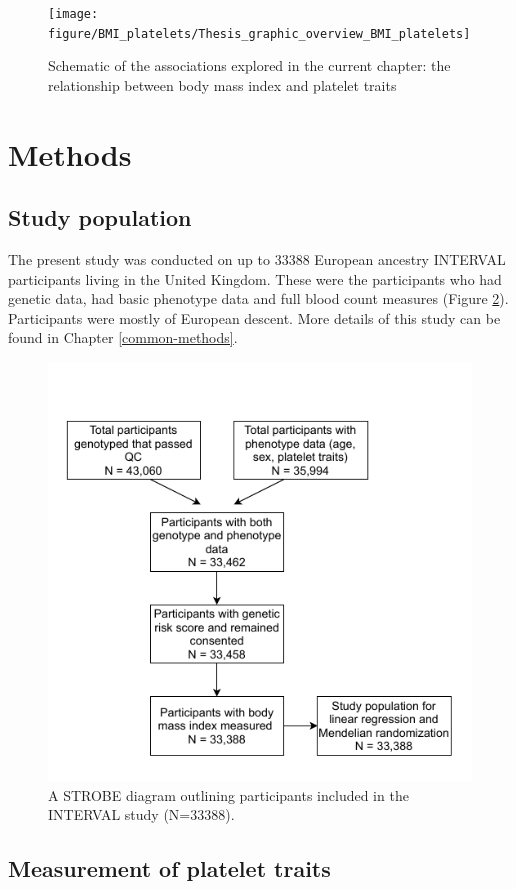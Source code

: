 \documentclass[11pt,twoside]{bristolthesis}
\begin{document}
\begin{figure}
\texttt{[image: figure/BMI\_platelets/Thesis\_graphic\_overview\_BMI\_platelets]} \caption[Schematic of the associations addressed in the current chapter]{Schematic of the associations explored in the current chapter: the relationship between body mass index and platelet traits}\label{fig:BMI-platelet-overview}
\end{figure}
\hypertarget{methods}{%
\section{Methods}\label{methods}}

\hypertarget{study-population}{%
\subsection{Study population}\label{study-population}}

The present study was conducted on up to 33388 European ancestry INTERVAL participants living in the United Kingdom. These were the participants who had genetic data, had basic phenotype data and full blood count measures (Figure \ref{fig:INTERVAL-STROBE}). Participants were mostly of European descent. More details of this study can be found in Chapter \ref{common-methods}.
\begin{figure}
\includegraphics[width=0.8\linewidth]{figure/BMI_platelets/STROBE_diagram} \caption{A STROBE diagram outlining participants included in the INTERVAL study (N=33388).}\label{fig:INTERVAL-STROBE}
\end{figure}
\hypertarget{measurement-of-platelet-traits}{%
\subsection{Measurement of platelet traits}\label{measurement-of-platelet-traits}}
\end{document}
